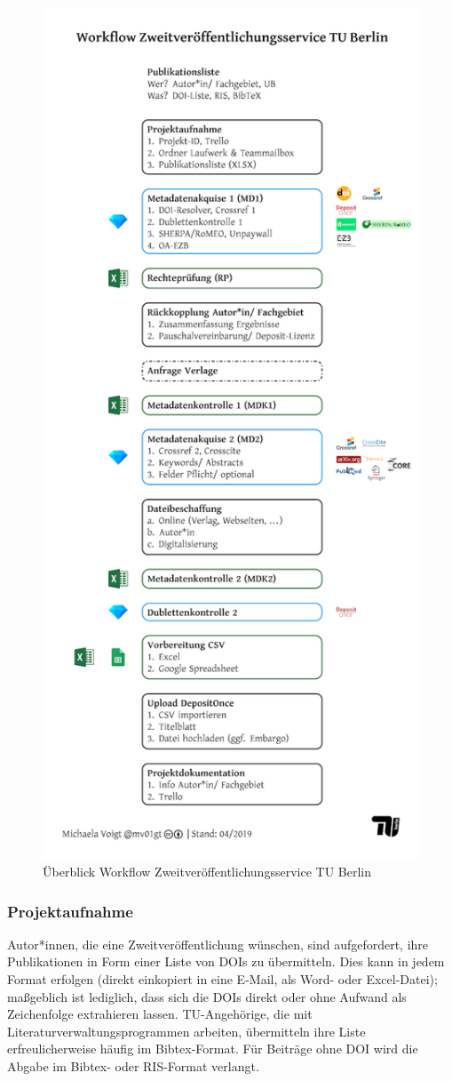 \documentclass[a4paper,
fontsize=11pt,
oneside,
numbers=noperiodatend,
parskip=half-,
bibliography=totoc,
final
]{scrartcl}
\begin{document}
\begin{figure}
\centering
\includegraphics[width=9.3 cm]{img/fig1.png}
\caption{Überblick Workflow Zweitveröffentlichungsservice TU Berlin}
\end{figure}

\hypertarget{projektaufnahme}{%
\subsubsection{Projektaufnahme}\label{projektaufnahme}}

Autor*innen, die eine Zweitveröffentlichung wünschen, sind aufgefordert,
ihre Publikationen in Form einer Liste von DOIs zu übermitteln. Dies
kann in jedem Format erfolgen (direkt einkopiert in eine E-Mail, als
Word- oder Excel-Datei); maßgeblich ist lediglich, dass sich die DOIs
direkt oder ohne Aufwand als Zeichenfolge extrahieren lassen.
TU-Angehörige, die mit Literaturverwaltungsprogrammen arbeiten,
übermitteln ihre Liste erfreulicherweise häufig im Bibtex-Format. Für
Beiträge ohne DOI wird die Abgabe im Bibtex- oder RIS-Format verlangt.
\end{document}
